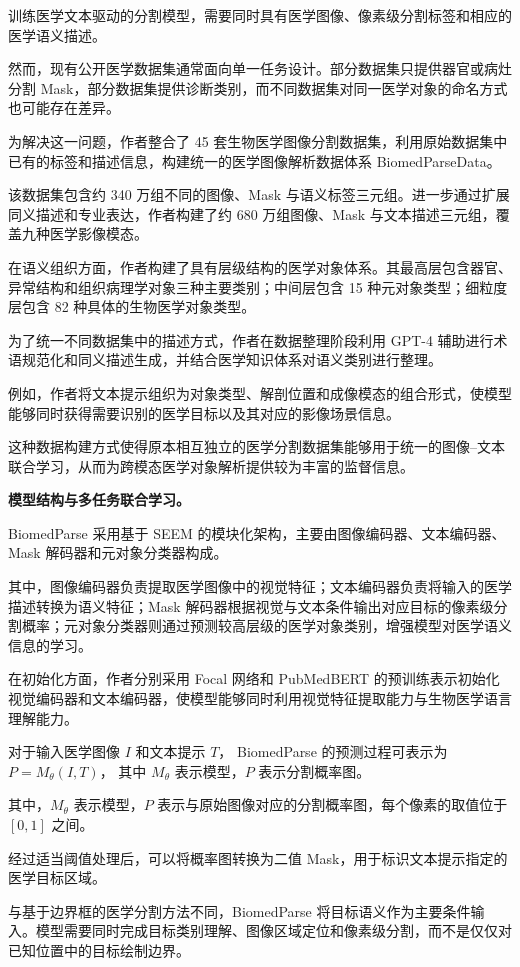 \documentclass[10.5pt,compsoc]{CjC}
\theoremstyle{mystyle}
\begin{document}
训练医学文本驱动的分割模型，需要同时具有医学图像、像素级分割标签和相应的医学语义描述。

然而，现有公开医学数据集通常面向单一任务设计。部分数据集只提供器官或病灶分割 Mask，部分数据集提供诊断类别，而不同数据集对同一医学对象的命名方式也可能存在差异。

为解决这一问题，作者整合了 45 套生物医学图像分割数据集，利用原始数据集中已有的标签和描述信息，构建统一的医学图像解析数据体系 BiomedParseData。

该数据集包含约 340 万组不同的图像、Mask 与语义标签三元组。进一步通过扩展同义描述和专业表达，作者构建了约 680 万组图像、Mask 与文本描述三元组，覆盖九种医学影像模态。

在语义组织方面，作者构建了具有层级结构的医学对象体系。其最高层包含器官、异常结构和组织病理学对象三种主要类别；中间层包含 15 种元对象类型；细粒度层包含 82 种具体的生物医学对象类型。

为了统一不同数据集中的描述方式，作者在数据整理阶段利用 GPT-4 辅助进行术语规范化和同义描述生成，并结合医学知识体系对语义类别进行整理。

例如，作者将文本提示组织为对象类型、解剖位置和成像模态的组合形式，使模型能够同时获得需要识别的医学目标以及其对应的影像场景信息。

这种数据构建方式使得原本相互独立的医学分割数据集能够用于统一的图像--文本联合学习，从而为跨模态医学对象解析提供较为丰富的监督信息。

\noindent\textbf{模型结构与多任务联合学习。}

BiomedParse 采用基于 SEEM 的模块化架构，主要由图像编码器、文本编码器、Mask 解码器和元对象分类器构成。

其中，图像编码器负责提取医学图像中的视觉特征；文本编码器负责将输入的医学描述转换为语义特征；Mask 解码器根据视觉与文本条件输出对应目标的像素级分割概率；元对象分类器则通过预测较高层级的医学对象类别，增强模型对医学语义信息的学习。

在初始化方面，作者分别采用 Focal 网络和 PubMedBERT 的预训练表示初始化视觉编码器和文本编码器，使模型能够同时利用视觉特征提取能力与生物医学语言理解能力。

对于输入医学图像 $I$ 和文本提示 $T$，
BiomedParse 的预测过程可表示为
$P=M_{\theta}(I,T)$，
其中 $M_{\theta}$ 表示模型，$P$ 表示分割概率图。

其中，$M_{\theta}$ 表示模型，$P$ 表示与原始图像对应的分割概率图，每个像素的取值位于 $[0,1]$ 之间。

经过适当阈值处理后，可以将概率图转换为二值 Mask，用于标识文本提示指定的医学目标区域。

与基于边界框的医学分割方法不同，BiomedParse 将目标语义作为主要条件输入。模型需要同时完成目标类别理解、图像区域定位和像素级分割，而不是仅仅对已知位置中的目标绘制边界。
\end{document}
